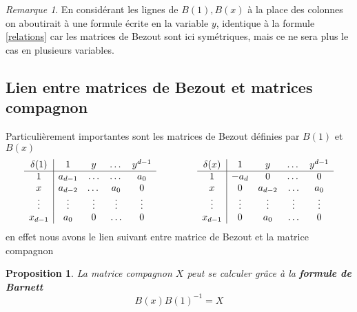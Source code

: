 \documentclass{article}
\theoremstyle{plain}%
\newtheorem{prop}{Proposition}
\theoremstyle{definition}
\theoremstyle{remark}
\newtheorem*{rem}{Remarque}
\begin{document}
\begin{rem}
En considérant les lignes de $B(1), B(x)$ à la place des colonnes on aboutirait à une formule écrite en la variable $y$, identique à la formule  \ref{relations} car les matrices de Bezout sont ici symétriques, mais ce ne sera plus le cas en plusieurs variables.
\end{rem}


\subsection{Lien entre matrices de Bezout et matrices compagnon}
\label{Bar}
Particulièrement importantes sont les matrices de Bezout définies par $B(1)$ et $B(x)$
\begin{equation}
	\begin{array}{c|cccc}
		\delta(1) & 1 & y & \dots & y^{d-1} \\
		\hline
		1 & a_{d-1} & \ldots & \dots & a_0 \\
		x & a_{d-2} & \dots & a_0 & 0 \\
		\vdots & \vdots & \vdots & \vdots & \vdots \\
		x_{d-1} & a_0 & 0 & \ldots & 0 \\
	\end{array}
	\hspace{1.5cm}
	\begin{array}{c|cccc}
		\delta(x) & 1 & y & \dots & y^{d-1} \\
		\hline
		1 & -a_{d} & 0 & \dots & 0 \\
		x & 0 & a_{d-2} & \ldots & a_0 \\
		\vdots & \vdots & \vdots & \vdots & \vdots \\
		x_{d-1} & 0 & a_0 & \ldots & 0 \\
	\end{array}
\end{equation}
en effet nous avons le lien suivant entre matrice de Bezout et la matrice compagnon 
\begin{prop}
\label{Barnett}
La matrice compagnon $X$ peut se calculer grâce à la {\bf formule de Barnett}
\cite{Barnett}
\begin{equation}
	B(x)B(1)^{-1} = X
\end{equation}
\end{prop}
\end{document}
